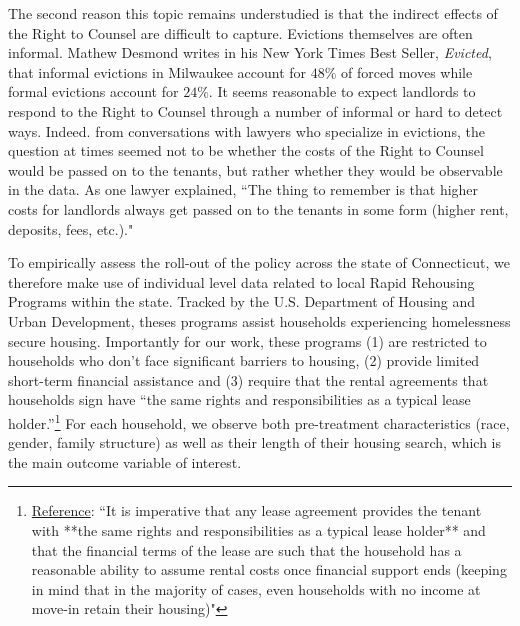 \documentclass[a4paper,12pt]{article}
\begin{document}
The second reason this topic remains understudied is that the indirect effects of the Right to Counsel are difficult to capture. Evictions themselves are often informal. Mathew Desmond writes in his New York Times Best Seller, \textit{Evicted}, that informal evictions in Milwaukee account for $48\%$ of forced moves while formal evictions account for $24\%$. It seems reasonable to expect landlords to respond to the Right to Counsel through a number of informal or hard to detect ways. Indeed. from conversations with lawyers who specialize in evictions, the question at times seemed not to be whether the costs of the Right to Counsel would be passed on to the tenants, but rather whether they would be observable in the data. As one lawyer explained,  ``The thing to remember is that higher costs for landlords always get passed on to the tenants in some form (higher rent, deposits, fees, etc.)."\par 
To empirically assess the roll-out of the policy across the state of Connecticut, we therefore make use of individual level data related to local Rapid Rehousing Programs within the state. Tracked by the U.S. Department of Housing and Urban Development, theses programs assist households experiencing homelessness secure housing. Importantly for our work, these programs (1) are restricted to households who don't face significant barriers to housing, (2) provide limited short-term financial assistance and (3) require that the rental agreements that households sign have ``the same rights and responsibilities as a typical lease holder.''\footnote{\href{thttps://endhomelessness.org/resource/rapid-re-housing-a-history-and-core-components/}{Reference}: ``It is imperative that any lease agreement provides the tenant with **the same rights and responsibilities as a typical lease holder** and that the financial terms of the lease are such that the household has a reasonable ability to assume rental costs once financial support ends (keeping in mind that in the majority of cases, even households with no income at move-in retain their housing)"} For each household, we observe both pre-treatment characteristics (race, gender, family structure) as well as their length of their housing search, which is the main outcome variable of interest. \par 
\end{document}
